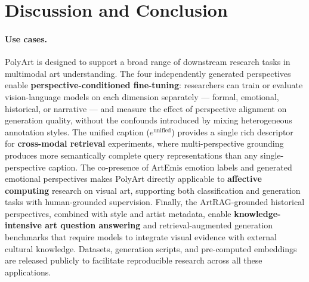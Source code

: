 \section{Discussion and Conclusion}

\paragraph{Use cases.}
PolyArt is designed to support a broad range of downstream research tasks in multimodal art understanding.
The four independently generated perspectives enable \textbf{perspective-conditioned fine-tuning}: researchers can train or evaluate vision-language models on each dimension separately --- formal, emotional, historical, or narrative --- and measure the effect of perspective alignment on generation quality, without the confounds introduced by mixing heterogeneous annotation styles.
The unified caption ($e^{\text{unified}}$) provides a single rich descriptor for \textbf{cross-modal retrieval} experiments, where multi-perspective grounding produces more semantically complete query representations than any single-perspective caption.
The co-presence of ArtEmis emotion labels and generated emotional perspectives makes PolyArt directly applicable to \textbf{affective computing} research on visual art, supporting both classification and generation tasks with human-grounded supervision.
Finally, the ArtRAG-grounded historical perspectives, combined with style and artist metadata, enable \textbf{knowledge-intensive art question answering} and retrieval-augmented generation benchmarks that require models to integrate visual evidence with external cultural knowledge.
Datasets, generation scripts, and pre-computed embeddings are released publicly to facilitate reproducible research across all these applications.
